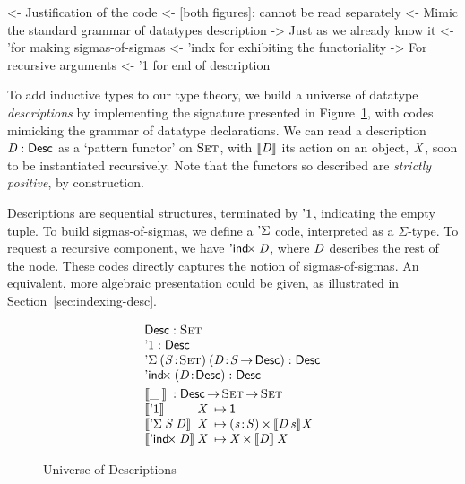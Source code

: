 \begin{wstructure}
<- Justification of the code 
    <- [both figures]: cannot be read separately
    <- Mimic the standard grammar of datatypes description
        -> Just as we already know it
        <- '\Sigma for making sigmas-of-sigmas
        <- 'indx for exhibiting the functoriality
            -> For recursive arguments
        <- '1 for end of description
\end{wstructure}

To add inductive types to our type theory, we build a universe of
datatype \emph{descriptions} by implementing the signature presented
in Figure~\ref{fig:desc_universe}, with codes mimicking the grammar of
datatype declarations. We can read a description $\V{D}:\Desc$ as a
`pattern functor' on $\Set$, with $\SYMBdescop{\V{D}}$ its action on
an object, \(\V{X}\), soon to be instantiated recursively. Note that
the functors so described are \emph{strictly positive}, by
construction.

Descriptions are sequential structures, terminated by $\DUnit$,
indicating the empty tuple. To build sigmas-of-sigmas, we define a
$\SYMBDSigma$ code, interpreted as a $\Sigma$-type. To request a
recursive component, we have $\DIndx{\V{D}}$, where \(\V{D}\)
describes the rest of the node. These codes directly captures the
notion of sigmas-of-sigmas. An equivalent, more algebraic presentation
could be given, as illustrated in Section~\ref{sec:indexing-desc}.

\begin{figure}
\[\stk{
\begin{array}{l}
\Desc : \Set\\
\DUnit : \Desc\\
\DSigma{(\Bhab{\V{S}}{\Set})}{(\Bhab{\V{D}}{\V{S} \To \Desc})} : \Desc\\
\DIndx{(\Bhab{\V{D}}{\Desc})} : \Desc \\
\end{array}
\smallskip\\
\begin{array}{l@{\V{X}\:\mapsto\:}l}     
\multicolumn{2}{l}{\descop{\_\:}{} : \Desc \To \Set \To \Set} \\
 \descop{\DUnit}{} &  \Unit \\
 \descop{\DSigma{\V{S}}{\V{D}}}{} &
     \SIGMAS{\Bhab{\V{s}}{\V{S}}}{\descop{\V{D}\,\V{s}}{\!\V{X}}}  \\
\descop{\DIndx{\V{D}}}{}  &  \TIMES{\V{X}}{\descop{\V{D}}{\V{X}}}
\end{array}
}\]

\caption{Universe of Descriptions}
\label{fig:desc_universe}
 
\end{figure}

